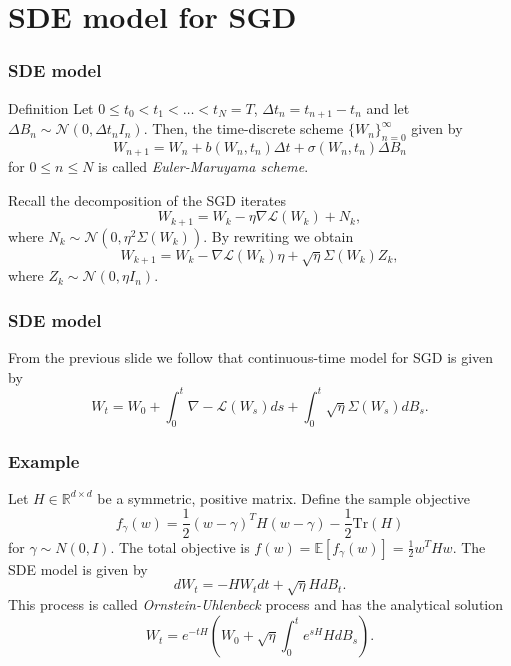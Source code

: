 \documentclass[17pt,institute=e10]{tuhh_presentation}
\newcommand{\CL}{\mathcal{L}}
\newcommand{\E}[1]{\mathbb{E}\left[{#1} \right]}
\begin{document}
\section{SDE model for SGD}
\begin{frame}
  \frametitle{SDE model}
  \begin{block}{Definition \autocite{kloedenNumericalSolutionStochastic2013}}
    Let $0 \leq t_0 < t_1 < \dots < t_N = T$, $\Delta t_n = t_{n+1} - t_n$ and let $\Delta B_n \sim \mathcal{N}(0,\Delta t_n I_n)$. Then, the time-discrete scheme $\{W_n\}_{n=0}^\infty$ given by
\begin{equation*}
  W_{n+1} = W_n + b(W_n, t_n)\Delta t + \sigma(W_n, t_n) \Delta B_n
\end{equation*}
for $0 \leq n \leq N$ is called \emph{\textcolor{purple-pontifex}{Euler-Maruyama scheme}}.
  \end{block}
  Recall the decomposition of the SGD iterates
  \begin{equation*}
    W_{k+1} = W_k - \eta \nabla \CL(W_k) + N_k,
  \end{equation*}
  where $N_k \sim \mathcal{N}(0, \eta^2\Sigma(W_k))$. By rewriting we obtain
  \begin{equation*}
    W_{k+1} = W_k - \nabla \CL(W_k) \eta + \sqrt{\eta}\Sigma(W_k) Z_k,
  \end{equation*}
  where $Z_k \sim \mathcal{N}(0, \eta I_n)$.
\end{frame}
\begin{frame}
  \frametitle{SDE model}
  From the previous slide we follow that \textcolor{purple-pontifex}{continuous-time} model for SGD is given by
  \begin{equation*}
    W_t = W_0 + \int_0^t \nabla - \CL(W_s) ds + \int_0^t \sqrt{\eta} \Sigma(W_s) dB_s.
  \end{equation*}
\end{frame}
\begin{frame}
  \frametitle{Example \autocite{liStochasticModifiedEquations2019}}
  Let $H \in \mathbb{R}^{d\times d}$ be a symmetric, positive matrix. Define the sample objective 
\begin{equation*}
  f_{\gamma}(w) = \frac{1}{2} (w - \gamma)^T H (w - \gamma) - \frac{1}{2} \text{Tr}(H)
\end{equation*}
for $\gamma \sim N(0,I)$. The total objective is $f(w) = \E{f_{\gamma}(w)} = \frac{1}{2} w^T H w$.
The SDE model is given by
\begin{equation*}
  dW_t = -H W_t dt + \sqrt{\eta}H dB_t.
\end{equation*}
This process is called \emph{Ornstein-Uhlenbeck} process and has the analytical solution
\begin{equation*}
  W_t = e^{-t H}(W_0 + \sqrt{\eta}\int_0^te^{s H}H dB_s).
\end{equation*}
\end{frame}
\end{document}
